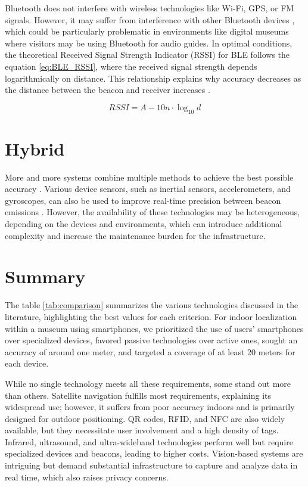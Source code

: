 Bluetooth does not interfere with wireless technologies like Wi-Fi, GPS, or FM signals. However, it may suffer from interference with other Bluetooth devices \cite{spachos_ble_2020}, which could be particularly problematic in environments like digital museums where visitors may be using Bluetooth for audio guides. In optimal conditions, the theoretical Received Signal Strength Indicator (RSSI) for BLE follows the equation \ref{eq:BLE_RSSI}, where the received signal strength depends logarithmically on distance. This relationship explains why accuracy decreases as the distance between the beacon and receiver increases \cite{spachos_ble_2020}. 

\begin{equation} \label{eq:BLE_RSSI}
    RSSI = A - 10n \cdot \log_{10}d
\end{equation}

\section{Hybrid}

More and more systems combine multiple methods to achieve the best possible accuracy \cite{shang_overview_2022}. Various device sensors, such as inertial sensors, accelerometers, and gyroscopes, can also be used to improve real-time precision between beacon emissions \cite{ali_locali_2017}. However, the availability of these technologies may be heterogeneous, depending on the devices and environments, which can introduce additional complexity and increase the maintenance burden for the infrastructure.

\section{Summary}

The table \ref{tab:comparison} summarizes the various technologies discussed in the literature, highlighting the best values for each criterion. For indoor localization within a museum using smartphones, we prioritized the use of users' smartphones over specialized devices, favored passive technologies over active ones, sought an accuracy of around one meter, and targeted a coverage of at least 20 meters for each device.  

While no single technology meets all these requirements, some stand out more than others. Satellite navigation fulfills most requirements, explaining its widespread use; however, it suffers from poor accuracy indoors and is primarily designed for outdoor positioning. QR codes, RFID, and NFC are also widely available, but they necessitate user involvement and a high density of tags. Infrared, ultrasound, and ultra-wideband technologies perform well but require specialized devices and beacons, leading to higher costs. Vision-based systems are intriguing but demand substantial infrastructure to capture and analyze data in real time, which also raises privacy concerns.  

